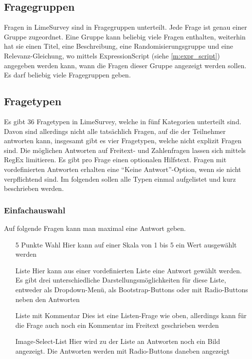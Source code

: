 \subsection{Fragegruppen}

Fragen in LimeSurvey sind in Fragegruppen unterteilt. Jede Frage ist genau einer Gruppe zugeordnet.
Eine Gruppe kann beliebig viele Fragen enthalten, weiterhin hat sie einen Titel, eine Beschreibung, eine Randomisierungsgruppe und eine Relevanz-Gleichung, wo mittels ExpressionScript (siehe \cref{m:expr_script}) angegeben werden kann, wann die Fragen dieser Gruppe angezeigt werden sollen.
Es darf beliebig viele Fragegruppen geben.

\subsection{Fragetypen}

Es gibt 36 Fragetypen in LimeSurvey, welche in fünf Kategorien unterteilt sind.
Davon sind allerdings nicht alle tatsächlich Fragen, auf die der Teilnehmer antworten kann, insgesamt gibt es vier Fragetypen, welche nicht explizit Fragen sind.
Die möglichen Antworten auf Freitext- und Zahlenfragen lassen sich mittels RegEx limitieren.
Es gibt pro Frage einen optionalen Hilfstext.
Fragen mit vordefinierten Antworten erhalten eine \enquote{Keine Antwort}-Option, wenn sie nicht verpflichtend sind.
Im folgenden sollen alle Typen einmal aufgelistet und kurz beschrieben werden.


\subsubsection{Einfachauswahl}

Auf folgende Fragen kann man maximal eine Antwort geben.
\begin{itemize}
	\item[5 Punkte Wahl] Hier kann auf einer Skala von 1 bis 5 ein Wert ausgewählt werden
	\item[Liste] Hier kann aus einer vordefinierten Liste eine Antwort gewählt werden. Es gibt drei unterschiedliche Darstellungsmöglichkeiten für diese Liste, entweder als Dropdown-Menü, als Bootstrap-Buttons oder mit Radio-Buttons neben den Antworten
	\item[Liste mit Kommentar] Dies ist eine Listen-Frage wie oben, allerdings kann für die Frage auch noch ein Kommentar im Freitext geschrieben werden
	\item[Image-Select-List] Hier wird zu der Liste an Antworten noch ein Bild angezeigt. Die Antworten werden mit Radio-Buttons daneben angezeigt
\end{itemize}

